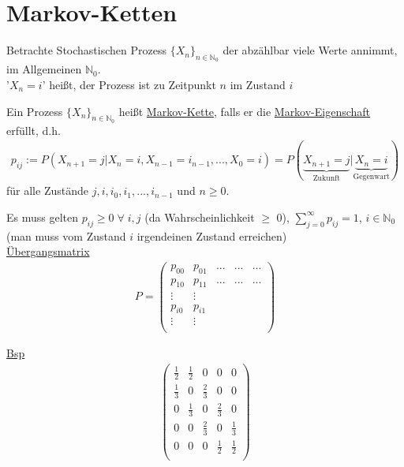 \documentclass[a4paper,openany]{book}
\theoremstyle{mytheoremstyle}
\theoremstyle{mytheoremstyle2}
\begin{document}
\chapter{Markov-Ketten}
Betrachte Stochastischen Prozess $\{X_n\}_{n \in \mathbb{N}_0} $ der abzählbar viele Werte annimmt, im Allgemeinen $\mathbb{N}_0$. \\
'$X_n=i$' heißt, der Prozess ist zu Zeitpunkt $n$ im Zustand $i$
\begin{defi}{15.1}{}
  Ein Prozess $\{X_n\}_{n \in \mathbb{N}_0}$ heißt \underline{Markov-Kette}, falls er die \underline{Markov-Eigenschaft} erfüllt, d.h.
  \begin{align*}
    p _{ij}:=P(X _{n+1}=j|X_n=i,X _{n-1}=i _{n-1},...,X_0=i)=P(\underbrace{X _{n+1}=j}_{\text{Zukunft}}|\underbrace{X_n=i}_{\text{Gegenwart}})  \end{align*}
  für alle Zustände $j,i,i_0,i_1,...,i _{n-1}$ und $n \geq 0 $.
\end{defi}
\begin{kor}{15.2}{}
  Es muss gelten $p _{ij}\geq 0 \;\forall\;i,j$ (da Wahrscheinlichkeit $\geq  $ 0), $\sum_{j=0}^{\infty }{p _{ij}}=1$, $i \in \mathbb{N}_0$ (man muss vom Zustand $i $ irgendeinen Zustand erreichen)\\
  \underline{Übergangsmatrix}
  \begin{align*}
    P=\begin{pmatrix}
      p _{00}&p _{01}&...&...&...\\
     p _{10}&p _{11}&...&...&...\\
     \vdots&\vdots&&&\\
     p _{i0}&p _{i1}&&&\\
     \vdots&\vdots&&&\\
    \end{pmatrix}
  \end{align*}

\end{kor}
  \underline{Bsp}
  \begin{align*}
    \begin{pmatrix}
      \frac{1}{2}&\frac{1}{2}&0&0&0\\
     \frac{1}{3}&0&\frac{2}{3}&0&0\\
     0&\frac{1}{3}&0&\frac{2}{3}&0\\
     0&0&\frac{2}{3}&0&\frac{1}{3}\\
     0&0&0&\frac{1}{2}&\frac{1}{2}\\
    \end{pmatrix}
  \end{align*}
\end{document}
